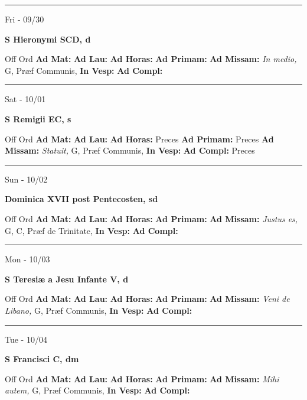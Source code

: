\documentclass[letterpaper, 10pt]{article}
\begin{document}
\hrule
\begin{center}
Fri - 09/30
\end{center}\textbf{ \large S Hieronymi SCD, \textnormal{\normalsize d}}
\begin{justify}
Off Ord
\textbf{Ad Mat: }
\textbf{Ad Lau: }
\textbf{Ad Horas: }
\textbf{Ad Primam: }
\textbf{Ad Missam:} \textit{In medio, } G, Præf Communis, 
\textbf{In Vesp: }
\textbf{Ad Compl: }\end{justify}



\hrule
\begin{center}
Sat - 10/01
\end{center}\textbf{ \large S Remigii EC, \textnormal{\normalsize s}}
\begin{justify}
Off Ord
\textbf{Ad Mat: }
\textbf{Ad Lau: }
\textbf{Ad Horas: }Preces
\textbf{Ad Primam: }Preces
\textbf{Ad Missam:} \textit{Statuit, } G, Præf Communis, 
\textbf{In Vesp: }
\textbf{Ad Compl: }Preces\end{justify}



\hrule
\begin{center}
Sun - 10/02
\end{center}\textbf{ \large Dominica XVII post Pentecosten, \textnormal{\normalsize sd}}
\begin{justify}
Off Ord
\textbf{Ad Mat: }
\textbf{Ad Lau: }
\textbf{Ad Horas: }
\textbf{Ad Primam: }
\textbf{Ad Missam:} \textit{Justus es, } G, C, Præf de Trinitate, 
\textbf{In Vesp: }
\textbf{Ad Compl: }\end{justify}



\hrule
\begin{center}
Mon - 10/03
\end{center}\textbf{ \large S Teresiæ a Jesu Infante V, \textnormal{\normalsize d}}
\begin{justify}
Off Ord
\textbf{Ad Mat: }
\textbf{Ad Lau: }
\textbf{Ad Horas: }
\textbf{Ad Primam: }
\textbf{Ad Missam:} \textit{Veni de Libano, } G, Præf Communis, 
\textbf{In Vesp: }
\textbf{Ad Compl: }\end{justify}



\hrule
\begin{center}
Tue - 10/04
\end{center}\textbf{ \large S Francisci C, \textnormal{\normalsize dm}}
\begin{justify}
Off Ord
\textbf{Ad Mat: }
\textbf{Ad Lau: }
\textbf{Ad Horas: }
\textbf{Ad Primam: }
\textbf{Ad Missam:} \textit{Mihi autem, } G, Præf Communis, 
\textbf{In Vesp: }
\textbf{Ad Compl: }\end{justify}
\end{document}
